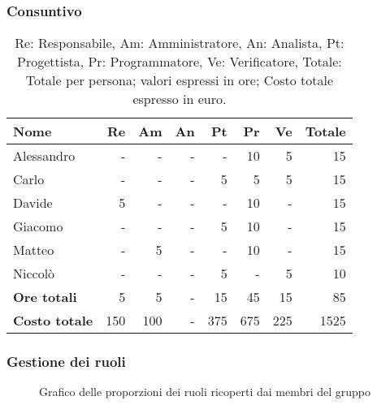 \subsubsection{Consuntivo}
\begin{table}[H]
	\centering
	\begin{tabular}{l|r|r|r|r|r|r|r}
		\textbf{Nome}         & \textbf{Re} & \textbf{Am} & \textbf{An} & \textbf{Pt} & \textbf{Pr} & \textbf{Ve} & \textbf{Totale} \\
		\hline
		Alessandro            & -           & -           & -           & -           & 10          & 5           & 15              \\
		Carlo                 & -           & -           & -           & 5           & 5           & 5           & 15              \\
		Davide                & 5           & -           & -           & -           & 10          & -           & 15              \\
		Giacomo               & -           & -           & -           & 5           & 10          & -           & 15              \\
		Matteo                & -           & 5           & -           & -           & 10          & -           & 15              \\
		Niccolò               & -           & -           & -           & 5           & -           & 5           & 10              \\
		\hline
		\textbf{Ore totali}   & 5           & 5           & -           & 15          & 45          & 15          & 85              \\
		\textbf{Costo totale} & 150         & 100         & -           & 375         & 675         & 225         & 1525
	\end{tabular}
	\caption{Re: Responsabile, Am: Amministratore, An: Analista, Pt: Progettista,
		Pr: Programmatore, Ve: Verificatore, Totale: Totale per persona; valori espressi in ore; Costo totale espresso in euro.}
\end{table}

\subsubsection{Gestione dei ruoli}
\begin{figure}[h]
	\centering
	\caption{Grafico delle proporzioni dei ruoli ricoperti dai membri del gruppo}
\end{figure}

